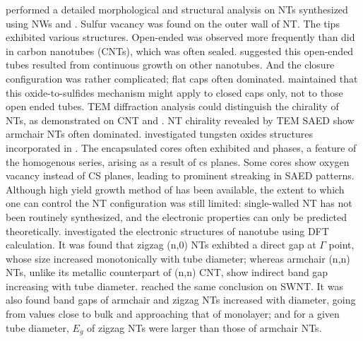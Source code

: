 \citeauthor{Zhu2000} performed a detailed morphological and structural analysis on  NTs synthesized using  NWs and .\cite{Zhu2000} Sulfur vacancy was found on the outer wall of NT. The tips exhibited various structures. Open-ended  was observed more frequently than did in carbon nanotubes (CNTs), which was often sealed. \citeauthor{Zhu2000} suggested this open-ended tubes resulted from continuous growth on other nanotubes. And the closure configuration was rather complicated; flat caps often dominated. \citeauthor{Zhu2000} maintained that this oxide-to-sulfides mechanism might apply to closed caps only, not to those open ended tubes.\cite{Zhu2000} TEM diffraction analysis could distinguish the chirality of NTs, as demonstrated on CNT\cite{Zhang1993} and .\cite{MARGULIS1996}  NT chirality revealed by TEM SAED show armchair NTs often dominated. \citeauthor{Sloan1999} investigated tungsten oxides structures incorporated in .\cite{Sloan1999} The encapsulated  cores often exhibited  and  phases,  a feature of the  homogenous series, arising as a result of \gls{cs} planes.\cite{Miyano} Some  cores show oxygen vacancy instead of CS planes, leading to prominent streaking in SAED patterns. Although high yield growth method of  has been available, the extent to which one can control the NT configuration was still limited: single-walled  NT has not been routinely synthesized, and the electronic properties can only be predicted theoretically. \citeauthor{Seifert2000} investigated the electronic structures of  nanotube using DFT calculation.\cite{Seifert2000} It was found that zigzag (n,0) NTs exhibted a direct gap at $\Gamma$ point, whose size increased monotonically with tube diameter; whereas armchair (n,n) NTs, unlike its metallic counterpart of (n,n) CNT, show indirect band gap increasing with tube diameter. \citeauthor{Zibouche2012} reached the same conclusion on  SWNT.\cite{Zibouche2012} It was also found band gaps of armchair and zigzag NTs increased with diameter, going from values close to bulk and approaching that of monolayer; and for a given tube diameter, $E_g$ of zigzag NTs were larger than those of armchair NTs. 

